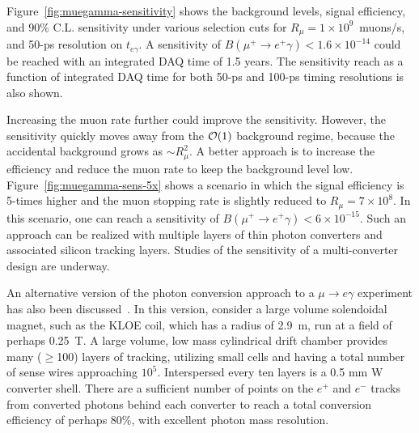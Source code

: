 Figure~\ref{fig:muegamma-sensitivity} shows the background levels, 
signal efficiency, and 90\%
C.L. sensitivity under various selection cuts for 
$R_\mu=1\times 10^{9}$~muons/s, and 50-ps resolution on $t_{e\gamma}$.
A sensitivity of $B(\mu^+\to e^+\gamma)<1.6\times 10^{-14}$ could be reached
with an integrated DAQ time of 1.5 years.
The sensitivity reach
as a function of integrated DAQ time for both 50-ps and 100-ps timing
resolutions is also shown.

Increasing the muon rate further could improve the sensitivity. However,
the sensitivity quickly moves away from the ${\cal O}(1)$ background regime, because the accidental
background grows as $\sim R_\mu^2$. A better approach is to increase the
efficiency and reduce the muon rate to keep the background level low. 
Figure~\ref{fig:muegamma-sens-5x} 
shows a scenario in which the signal efficiency is 5-times higher
and the muon stopping rate is slightly reduced to $R_\mu=7\times 10^{8}$. 
In this scenario, one can reach a sensitivity of $B(\mu^+\to e^+\gamma)<6\times 10^{-15}$.
Such an approach can be realized with multiple layers of thin photon converters and associated silicon tracking layers. Studies of the sensitivity of a multi-converter design are underway.

An alternative version of the photon conversion approach to a $\mu \to e \gamma$ 
experiment has also been discussed~\cite{franco}. In this version, consider a large volume
solendoidal magnet, such as the KLOE coil, which has a radius of 2.9~m, run at a
field of perhaps 0.25~T. A large volume, low mass cylindrical drift chamber 
provides many ($\ge$100) layers of tracking, utilizing small cells and having 
a total number of sense wires approaching $10^5$. Interspersed every ten layers 
is a 0.5 mm W converter shell. There are a sufficient number of points on the 
$e^+$ and $e^-$ tracks from converted photons behind each converter to reach a
 total conversion efficiency of perhaps 80\%, with excellent photon mass 
resolution. 



